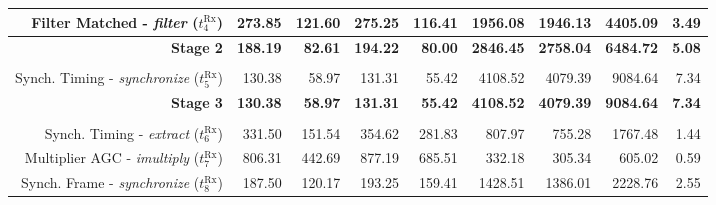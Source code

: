 \begin{table}[htp]
{{\begin{tabular}{r | r r r r  | r r r | r}
    \rowcolor{Paired-7!15}
                   Filter Matched -        \emph{filter} ($t^\text{Rx}_{4}$)  &          273.85  &           121.60  &           275.25  &                                 116.41  &          1956.08  &          1946.13  &          4405.09  &          3.49  \\ \hline
                                                             \textbf{Stage 2} &  \textbf{188.19} &    \textbf{82.61} &   \textbf{194.22} &                          \textbf{80.00} &  \textbf{2846.45} &  \textbf{2758.04} &  \textbf{6484.72} & \textbf{5.08}  \\ %
                                                                              &                  &                   &                   &                                         &                   &                   &                   &                \\
    \rowcolor{Paired-7!15}
                   Synch. Timing  -   \emph{synchronize} ($t^\text{Rx}_{5}$)  &          130.38  &            58.97  &           131.31  &                                  55.42  &          4108.52  &          4079.39  &          9084.64  &          7.34  \\ \hline
    \rowcolor{Paired-5!15}                                   \textbf{Stage 3} &  \textbf{130.38} &    \textbf{58.97} &   \textbf{131.31} &                          \textbf{55.42} &  \textbf{4108.52} &  \textbf{4079.39} &  \textbf{9084.64} &  \textbf{7.34} \\ %
                                                                              &                  &                   &                   &                                         &                   &                   &                   &                \\
    \rowcolor{Paired-7!15}
                    Synch. Timing -       \emph{extract} ($t^\text{Rx}_{6}$)  &          331.50  &           151.54  &           354.62  &                                 281.83  &           807.97  &           755.28  &          1767.48  &          1.44  \\
                   Multiplier AGC -     \emph{imultiply} ($t^\text{Rx}_{7}$)  &          806.31  &           442.69  &           877.19  &                                 685.51  &           332.18  &           305.34  &           605.02  &          0.59  \\
    \rowcolor{Paired-7!15}
                     Synch. Frame -   \emph{synchronize} ($t^\text{Rx}_{8}$)  &          187.50  &           120.17  &           193.25  &                                 159.41  &          1428.51  &          1386.01  &          2228.76  &          2.55  \\ \hline

\end{tabular}}}
\end{table}
